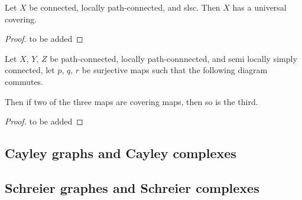 \documentclass[11pt,a4paper]{article}
\begin{document}
\begin{theorem}
  Let $X$ be connected, locally path-connected, and slsc.
  Then $X$ has a universal covering.
\end{theorem}
\begin{proof}
  to be added
\end{proof}

\begin{lemma}
  Let $X$, $Y$, $Z$ be path-connected, locally path-connnected,
  and semi locally simply connected,
  let $p$, $q$, $r$ be surjective maps such that the following diagram
  commutes.
  \begin{center}
  \end{center}
  Then if two of the three maps are covering maps, then so is the third.
\end{lemma}
\begin{proof}
  to be added
\end{proof}

\subsection{Cayley graphs and Cayley complexes}
\subsection{Schreier graphes and Schreier complexes}










\end{document}
